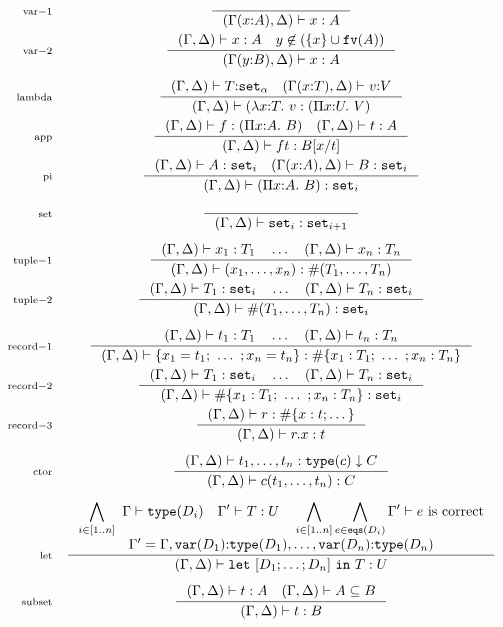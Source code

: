 \documentclass{article}
\newcommand{\rectyp}[1]{\#\{#1\}}
\newcommand{\recval}[1]{\{#1\}}
\newcommand{\fn}[1]{\mathtt{#1}}
\newcommand{\set}[1]{\fn{set}_{#1}}
\newcommand{\rctor}[4]{#1 |- {#2} : {#3} \downarrow {#4}}
\newcommand{\lamexpr}[3]{\lambda {#1}{:}{#2}.\ {#3}}
\newcommand{\Piexpr}[3]{\Pi {#1}{:}{#2}.\ {#3}}
\newcommand{\letexpr}[2]{\fn{let}\ {#1}\ \fn{in}\ {#2}}
\newcommand{\rlbl}[1]{\mathrm{\scriptstyle{}#1}}
\newcommand{\ctxcons}[3]{#1 (#2{:}#3)}
\newcommand{\ctx}[2]{(#1,#2)}
\newcommand{\subtype}[2]{#1 \subseteq #2}
\begin{document}
\begin{gather*}
\begin{array}{rc}
\rlbl{var-1}&
\inference{}{\ctx{\ctxcons{\Gamma}{x}{A}}{\Delta} |- x : A}\\[1em]
\rlbl{var-2}&
\inference{\defctx{} |- x : A \quad y \not\in (\{x\} \cup \fn{fv}(A))}
          {\ctx{\ctxcons{\Gamma}{y}{B}}{\Delta} |- x : A}\\[1.5em]
\rlbl{lambda}&
\inference{\defctx{}                 |- T{:}\set{\alpha}
     \quad \ctx{\ctxcons{\Gamma}{x}{T}}{\Delta} |- v{:}V}
          {\defctx{} |- (\lamexpr{x}{T}{v} : (\Piexpr{x}{U}{V})}\\[1em]
\rlbl{app}&
\inference{\defctx{} |- f : (\Piexpr{x}{A}{B}) \quad \ctx{\Gamma}{\Delta} |- t : A  }
          {\defctx{} |- f t : B[x/t] }\\[1em]
\rlbl{pi}&
\inference{\defctx{} |- A : \set{i}
     \quad \ctx{\ctxcons{\Gamma}{x}{A}}{\Delta} |- B : \set{i}}
          {\defctx{} |- (\Piexpr{x}{A}{B}) : \set{i}}\\[1.5em]
\rlbl{set}&
\inference{}{\defctx{} |- \set{i} : \set{i+1}}\\[1.5em]
\rlbl{tuple-1}&
\inference{\defctx{} |- x_1 : T_1
     \quad \dots
     \quad \defctx{} |- x_n : T_n}
          {\defctx{} |- (x_1, \dots, x_n) : \#(T_1, \dots, T_n)}\\[1em]
\rlbl{tuple-2}&
\inference{\defctx{} |- T_1 : \set{i}
     \quad \dots
     \quad \defctx{} |- T_n : \set{i}}
          {\defctx{} |- \#(T_1, \dots, T_n) : \set{i}}\\[1.5em]
\rlbl{record-1}&
\inference{\defctx{} |- t_1 : T_1
     \quad \dots
     \quad \defctx{} |- t_n : T_n }
          {\defctx{} |- \recval{ x_1 = t_1;\ \dots\ ; x_n = t_n} 
                     : \rectyp{ x_1 : T_1;\ \dots\ ; x_n : T_n}}\\[1em]
\rlbl{record-2}&
\inference{\defctx{} |- T_1 : \set{i}
     \quad \dots
     \quad \defctx{} |- T_n : \set{i}}
          {\defctx{} |- \rectyp{ x_1 : T_1;\ \dots\ ; x_n : T_n} : \set{i}}\\[1em]
\rlbl{record-3}&
\inference{\defctx{} |- r : \rectyp{ x : t; \dots }}
          {\defctx{} |- r.x : t }\\[1.5em]
\rlbl{ctor}&
\inference{\rctor{\defctx{}}{t_1,\dots,t_n}{\fn{type}(c)}{C}}
          {\defctx{} |- c(t_1,\dots,t_n) : C}\\[1.5em]
\rlbl{let}&
\inference{\displaystyle
           \bigwedge_{i\in[1..n]}\ \Gamma |- \fn{type}(D_i)\quad
           \Gamma' |- T : U\quad
           \bigwedge_{i\in[1..n]} \bigwedge_{e \in \fn{eqs}(D_i)} \Gamma' |- e\text{ is correct}\\
           \Gamma' = \Gamma,\fn{var}(D_1){:}\fn{type}(D_1), \dots, \fn{var}(D_n){:}\fn{type}(D_n)}
          {\defctx{} |- \letexpr{[D_1; \dots; D_n]}{T} : U}
\\[1.5em]
\rlbl{subset}&
\inference{\defctx |- t : A
     \quad \defctx |- \subtype{A}{B}}
          {\defctx |- t : B}\\[1.5em]
\end{array}
\end{gather*}
\end{document}
